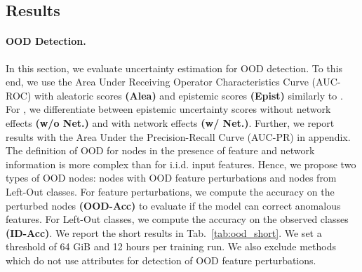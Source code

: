 \subsection{Results}
 
\paragraph{OOD Detection.} In this section, we evaluate uncertainty estimation for OOD detection. To this end, we use the Area Under Receiving Operator Characteristics Curve (AUC-ROC) with aleatoric scores  \textbf{(Alea)} and epistemic scores  \textbf{(Epist)} similarly to \citep{charpentier2020, Zhao2020, Malinin2018, Malinin2019a, Malinin2019b, Liu2020a}. For \GPNacro{}, we differentiate between epistemic uncertainty scores without network effects \textbf{(w/o Net.)} and with network effects \textbf{(w/ Net.)}. Further, we report results with the Area Under the Precision-Recall Curve (AUC-PR) in appendix. The definition of OOD for nodes in the presence of feature and network information is more complex than for i.i.d. input features. Hence, we propose two types of OOD nodes: nodes with OOD feature perturbations and nodes from Left-Out classes. For feature perturbations, we compute the accuracy on the perturbed nodes \textbf{(OOD-Acc)} to evaluate if the model can correct anomalous features. For Left-Out classes, we compute the accuracy on the observed classes \textbf{(ID-Acc)}. We report the short results in Tab.~\ref{tab:ood_short}. We set a threshold of 64 GiB and 12 hours per training run. We also exclude methods which do not use attributes for detection of OOD feature perturbations. 


